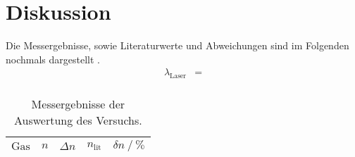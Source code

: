 \section{Diskussion}
\label{sec:Diskussion}
Die Messergebnisse, sowie Literaturwerte und Abweichungen sind im Folgenden nochmals dargestellt \cite{Quelle1} \cite{Quelle2}.
\begin{align*}
  \lambda_{\text{Laser}} &= \\
\end{align*}

\begin{table}
  \centering
  \caption{Messergebnisse der Auswertung des Versuchs.}
  \label{tab:irgendwas}
  \begin{tabular}{c c c c c}
    \toprule
    {$\text{Gas}$} & {$n$} & {$\Delta n$} & {$n_{\text{lit}}$} & {$\delta n \:/\: \si{\percent}$}\\
    \midrule
    
    \bottomrule
  \end{tabular}
\end{table}




